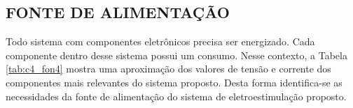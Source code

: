 




\subsection{FONTE DE ALIMENTAÇÃO} 
Todo sistema com componentes eletrônicos precisa ser energizado. Cada componente dentro desse sistema possui um consumo. Nesse contexto, a Tabela \ref{tab:c4_fon4} mostra uma aproximação dos valores de tensão e corrente dos componentes mais relevantes do sistema proposto. Desta forma identifica-se as necessidades da fonte de alimentação do sistema de eletroestimulação proposto.


